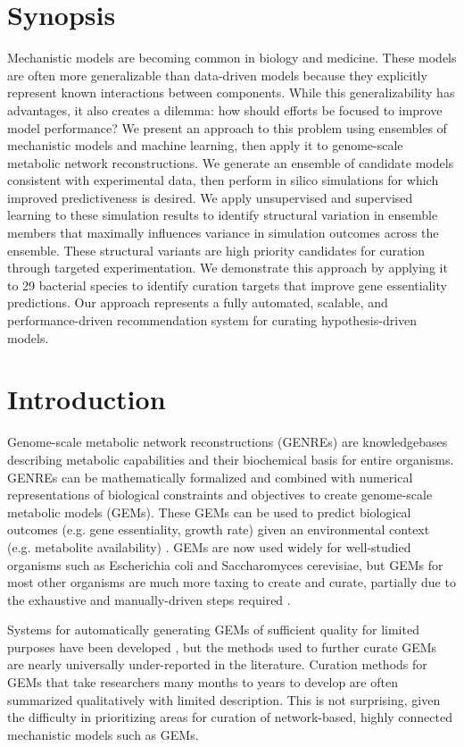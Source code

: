 \documentclass[11pt,onecolumn,notitlepage,openany,twoside]{book}
\begin{document}
\begin{refsection}
\section{Synopsis}
Mechanistic models are becoming common in biology and medicine. These models are often more generalizable than data-driven models because they explicitly represent known interactions between components. While this generalizability has advantages, it also creates a dilemma: how should efforts be focused to improve model performance? We present an approach to this problem using ensembles of mechanistic models and machine learning, then apply it to genome-scale metabolic network reconstructions. We generate an ensemble of candidate models consistent with experimental data, then perform in silico simulations for which improved predictiveness is desired. We apply unsupervised and supervised learning to these simulation results to identify structural variation in ensemble members that maximally influences variance in simulation outcomes across the ensemble. These structural variants are high priority candidates for curation through targeted experimentation. We demonstrate this approach by applying it to 29 bacterial species to identify curation targets that improve gene essentiality predictions. Our approach represents a fully automated, scalable, and performance-driven recommendation system for curating hypothesis-driven models.

\section{Introduction}

Genome-scale metabolic network reconstructions (GENREs) are knowledgebases describing metabolic capabilities and their biochemical basis for entire organisms. GENREs can be mathematically formalized and combined with numerical representations of biological constraints and objectives to create genome-scale metabolic models (GEMs). These GEMs can be used to predict biological outcomes (e.g. gene essentiality, growth rate) given an environmental context (e.g. metabolite availability) \cite{Oberhardt2009-iu}. GEMs are now used widely for well-studied organisms such as Escherichia coli and Saccharomyces cerevisiae, but GEMs for most other organisms are much more taxing to create and curate, partially due to the exhaustive and manually-driven steps required \cite{Thiele2010-yq}.

Systems for automatically generating GEMs of sufficient quality for limited purposes have been developed \cite{Henry2010-um}, but the methods used to further curate GEMs are nearly universally under-reported in the literature. Curation methods for GEMs that take researchers many months to years to develop are often summarized qualitatively with limited description. This is not surprising, given the difficulty in prioritizing areas for curation of network-based, highly connected mechanistic models such as GEMs.


\end{refsection}
\end{document}
